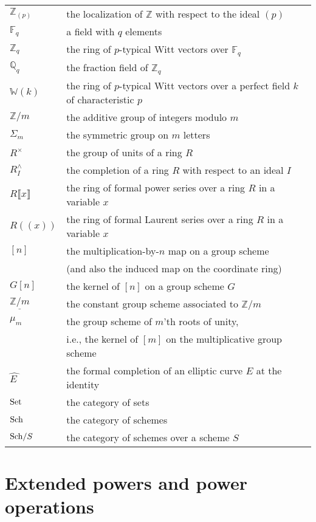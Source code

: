 \documentclass{gtpart}
\theoremstyle{definition}
\theoremstyle{remark}
\newcommand{\mb}[1]{\mathbb{#1}}
\newcommand{\Sch}{{\rm Sch}}
\newcommand{\Set}{{\rm Set}}
\newcommand{\BF}{{\mb F}}
\newcommand{\BQ}{{\mb Q}}
\newcommand{\BW}{{\mb W}}
\newcommand{\BZ}{{\mb Z}}
\newcommand{\HE}{\widehat{E~}\!}
\numberwithin{equation}{section}
\numberwithin{thm}{section}
\begin{document}
\begin{center}
\begin{tabular}{ll}
 $\BZ_{(p)}$ & the localization of $\BZ$ with respect to the ideal $(p)$ \\
 $\BF_q$ & a field with $q$ elements \\
 $\BZ_q$ & the ring of $p$-typical Witt vectors over $\BF_q$ \\
 $\BQ_q$ & the fraction field of $\BZ_q$ \\
 $\BW(k)$ & the ring of $p$-typical Witt vectors over a perfect field $k$ of characteristic $p$ \\
 $\BZ/m$ & the additive group of integers modulo $m$ \\
 $\Sigma_m$ & the symmetric group on $m$ letters \\
 $R^\times$ & the group of units of a ring $R$ \\
 $R_I^\wedge$ & the completion of a ring $R$ with respect to an ideal $I$ \\
 $R\llbracket x \rrbracket$ & the ring of formal power series over a ring $R$ in a variable $x$ \\
 $R (\!(x)\!)$ & the ring of formal Laurent series over a ring $R$ in a variable $x$ \\
 $[n]$ & the multiplication-by-$n$ map on a group scheme \\
       & (and also the induced map on the coordinate ring) \\
 $G[n]$ & the kernel of $[n]$ on a group scheme $G$ \\
 $\underline{\BZ/m}$ & the constant group scheme associated to $\BZ/m$ \\
 $\mu_m$ & the group scheme of $m$'th roots of unity, \\
         & i.e., the kernel of $[m]$ on the multiplicative group scheme \\
 $\HE$ & the formal completion of an elliptic curve $E$ at the identity \\
 $\Set$ & the category of sets \\
 $\Sch$ & the category of schemes \\
 $\Sch/S$ & the category of schemes over a scheme $S$ \\
\end{tabular}
\end{center}


\section{Extended powers and power operations}
\label{sec:po}
\end{document}
